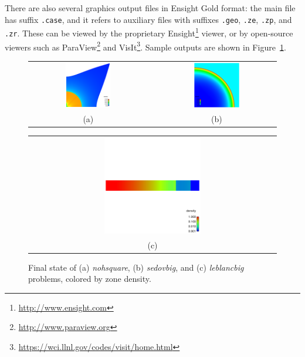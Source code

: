 \documentclass[11pt,letterpaper]{article}
\begin{document}
There are also several graphics output files in Ensight Gold format:
the main file has suffix {\tt.case}, and it refers to auxiliary files
with suffixes {\tt.geo}, {\tt.ze}, {\tt.zp}, and {\tt.zr}.  These
can be viewed by the proprietary
Ensight\footnote{\url{http://www.ensight.com}}
viewer, or by open-source viewers such as
ParaView\footnote{\url{http://www.paraview.org}} and
VisIt\footnote{\url{https://wci.llnl.gov/codes/visit/home.html}}.
Sample outputs are shown in Figure~\ref{fig:output}.
\begin{figure}
    \centering
    \begin{tabular}{ccc}
    \includegraphics[width=0.40\textwidth]{noh-result.png} &
    \hspace{0.06\textwidth} &
    \includegraphics[width=0.40\textwidth]{sedov-result.png} \\
    (a) && (b) \\
    \end{tabular}
    \begin{tabular}{c}
    \includegraphics[width=0.40\textwidth]{leblanc-result.png} \\
    (c) \\
    \end{tabular}
    \caption{Final state of (a) {\em nohsquare}, (b) {\em sedovbig},
    and (c) {\em leblancbig} problems, colored by zone density.}
    \label{fig:output}
\end{figure}
\end{document}
